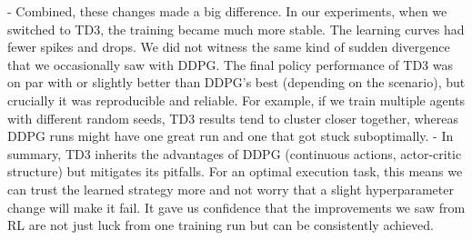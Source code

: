 \documentclass[11pt]{article}
\begin{document}
		- Combined, these changes made a big difference. In our experiments, when we switched to TD3, the training became much more stable. The learning curves had fewer spikes and drops. We did not witness the same kind of sudden divergence that we occasionally saw with DDPG. The final policy performance of TD3 was on par with or slightly better than DDPG’s best (depending on the scenario), but crucially it was reproducible and reliable. For example, if we train multiple agents with different random seeds, TD3 results tend to cluster closer together, whereas DDPG runs might have one great run and one that got stuck suboptimally.
		- In summary, TD3 inherits the advantages of DDPG (continuous actions, actor-critic structure) but mitigates its pitfalls. For an optimal execution task, this means we can trust the learned strategy more and not worry that a slight hyperparameter change will make it fail. It gave us confidence that the improvements we saw from RL are not just luck from one training run but can be consistently achieved.
	
	
	
\end{document}
